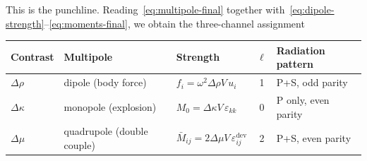 \documentclass[11pt,a4paper]{article}
\newcommand{\eps}{\varepsilon}
\newcommand{\dev}{\mathrm{dev}}
\theoremstyle{plain}
\theoremstyle{definition}
\theoremstyle{remark}
\begin{document}
This is the punchline.  Reading~\eqref{eq:multipole-final} together
with~\eqref{eq:dipole-strength}--\eqref{eq:moments-final}, we obtain the
three-channel assignment
\begin{center}
\begin{tabular}{lll@{\quad}c@{\quad}l}
\toprule
Contrast & Multipole & Strength & $\ell$ & Radiation pattern\\
\midrule
$\Delta\rho$ & dipole (body force)         & $f_i=\omega^2\Delta\rho V\,u_i$        & 1 & P+S, odd parity\\
$\Delta\kappa$ & monopole (explosion)      & $M_0=\Delta\kappa V\,\eps_{kk}$        & 0 & P only, even parity\\
$\Delta\mu$ & quadrupole (double couple)   & $\bar{M}_{ij}=2\Delta\mu V\,\eps_{ij}^{\dev}$ & 2 & P+S, even parity\\
\bottomrule
\end{tabular}
\end{center}
\end{document}

